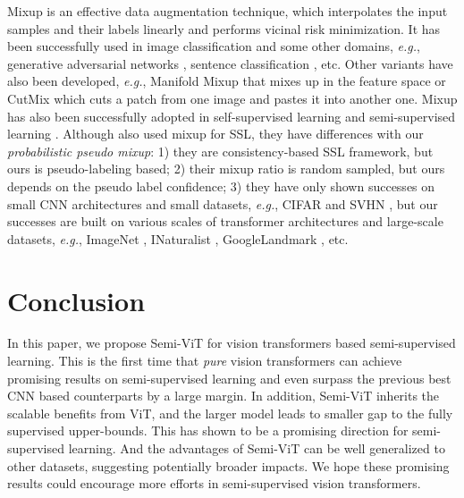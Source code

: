 \documentclass{article}
\newcommand\eg{\emph{e.g.}}
\begin{document}
Mixup \cite{DBLP:conf/iclr/ZhangCDL18} is an effective data augmentation technique, which interpolates the input samples and their labels linearly and performs vicinal risk minimization. It has been successfully used in image classification and some other domains, \eg, generative adversarial networks \cite{DBLP:conf/icml/LucasTOV18}, sentence classification \cite{DBLP:conf/aaai/Guo20}, etc. Other variants have also been developed, \eg, Manifold Mixup \cite{DBLP:conf/icml/VermaLBNMLB19} that mixes up in the feature space or CutMix \cite{DBLP:conf/iccv/YunHCOYC19} which cuts a patch from one image and pastes it into another one. Mixup has also been successfully adopted in self-supervised learning \cite{DBLP:conf/nips/KalantidisSPWL20,DBLP:conf/iclr/LeeZSLSL21} and semi-supervised learning \cite{DBLP:conf/nips/BerthelotCGPOR19,DBLP:conf/ijcai/VermaLKBL19,DBLP:conf/iclr/BerthelotCCKSZR20}. Although \cite{DBLP:conf/nips/BerthelotCGPOR19,DBLP:conf/ijcai/VermaLKBL19,DBLP:conf/iclr/BerthelotCCKSZR20} also used mixup for SSL, they have differences with our \emph{probabilistic pseudo mixup}: 1) they are consistency-based SSL framework, but ours is pseudo-labeling based; 2) their mixup ratio is random sampled, but ours depends on the pseudo label confidence; 3) they have only shown successes on small CNN architectures and small datasets, \eg, CIFAR \cite{krizhevsky2009learning} and SVHN \cite{netzer2011reading}, but our successes are built on various scales of transformer architectures and large-scale datasets, \eg, ImageNet \cite{DBLP:journals/ijcv/RussakovskyDSKS15}, INaturalist \cite{DBLP:journals/corr/HornASSAPB17}, GoogleLandmark \cite{DBLP:conf/iccv/NohASWH17}, etc. 



\section{Conclusion}

In this paper, we propose Semi-ViT for vision transformers based semi-supervised learning. This is the first time that \emph{pure} vision transformers can achieve promising results on semi-supervised learning and even surpass the previous best CNN based counterparts by a large margin. In addition, Semi-ViT inherits the scalable benefits from ViT, and the larger model leads to smaller gap to the fully supervised upper-bounds. This has shown to be a promising direction for semi-supervised learning. And the advantages of Semi-ViT can be well generalized to other datasets, suggesting potentially broader impacts. We hope these promising results could encourage more efforts in semi-supervised vision transformers.
\end{document}
